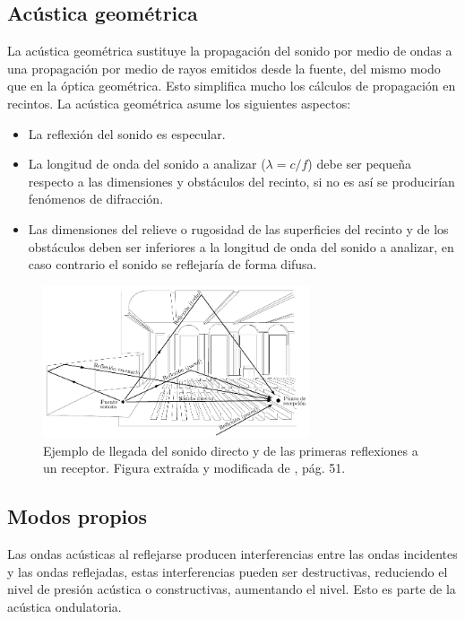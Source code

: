 \subsection{Acústica geométrica}
\label{acusticageometrica}
La acústica geométrica sustituye la propagación del sonido por medio de ondas a una propagación por medio de rayos emitidos desde la fuente, del mismo modo que en la óptica geométrica. Esto simplifica mucho los cálculos de propagación en recintos.
La acústica geométrica asume los siguientes aspectos:

\begin{itemize}
	\item La reflexión del sonido es especular.
	\item La longitud de onda del sonido a analizar ($\lambda=c/f$) debe ser pequeña respecto a las dimensiones y obstáculos del recinto, si no es así se producirían fenómenos de difracción.
	\item Las dimensiones del relieve o rugosidad de las superficies del recinto y de los obstáculos deben ser inferiores a la longitud de onda del sonido a analizar, en caso contrario el sonido se reflejaría de forma difusa.
\end{itemize}

\begin{figure}[ht]
    \centering
    \includegraphics[width=0.7\textwidth]{archivos/geometrica.pdf}
    \caption{Ejemplo de llegada del sonido directo y de las primeras reflexiones a un receptor. Figura extraída y modificada de \cite{Carrión1998}, pág. 51.}
\end{figure}
\FloatBarrier

\subsection{Modos propios}
\label{modospropios}

Las ondas acústicas al reflejarse producen interferencias entre las ondas incidentes y las ondas reflejadas, estas interferencias pueden ser destructivas, reduciendo el nivel de presión acústica o constructivas, aumentando el nivel. Esto es parte de la acústica ondulatoria.

